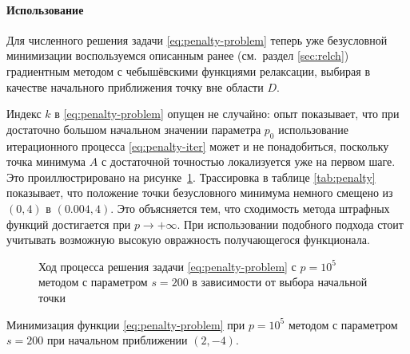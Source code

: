 

\paragraph{Использование \relch{}}

Для численного решения задачи \eqref{eq:penalty-problem} теперь уже
безусловной минимизации воспользуемся описанным ранее (см. раздел
\ref{sec:relch}) градиентным методом с чебышёвскими функциями
релаксации, выбирая в качестве начального приближения точку вне
области $D$.

Индекс $k$ в \eqref{eq:penalty-problem} опущен не случайно: опыт
показывает, что при достаточно большом начальном значении параметра
$p_0$ использование итерационного процесса \eqref{eq:penalty-iter}
может и не понадобиться, поскольку точка минимума $A$ с достаточной
точностью локализуется уже на первом шаге. Это проиллюстрировано на
рисунке \ref{fig:penalty}. Трассировка в таблице \ref{tab:penalty}
показывает, что положение точки безусловного минимума немного смещено
из $(0,4)$ в $(0.004, 4)$. Это объясняется тем, что сходимость метода
штрафных функций достигается при $p \to +\infty$. При использовании
подобного подхода стоит учитывать возможную высокую овражность
получающегося функционала.

\begin{figure}[p]
  \centering
  \caption[Метод штрафных функций]{Ход процесса решения задачи
    \eqref{eq:penalty-problem} с $p=10^5$ методом \relch{} с
    параметром $s=200$ в зависимости от выбора начальной точки}
  \label{fig:penalty}
\end{figure}

\begin{table}[p]
  \centering
  
  \caption{Минимизация функции \eqref{eq:penalty-problem} при $p=10^5$
    методом \relch{} с параметром $s=200$ при начальном приближении $(2,-4)$.}
  \label{tab:penalty}
\end{table}
